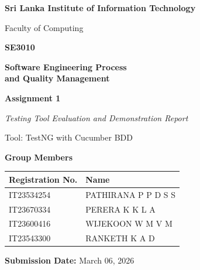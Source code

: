 \documentclass[12pt,a4paper]{article}
\begin{document}
\begin{titlepage}
    \centering
    \vspace*{1.5cm}

    {\Large\textbf{Sri Lanka Institute of Information Technology}\par}
    \vspace{0.3cm}
    {\large Faculty of Computing\par}

    \vspace{2cm}

    {\LARGE\bfseries\color{sliitblue} SE3010\par}
    \vspace{0.3cm}
    {\Large\bfseries Software Engineering Process\\and Quality Management\par}

    \vspace{1.5cm}

    {\Huge\bfseries Assignment 1\par}
    \vspace{0.5cm}
    {\Large\itshape Testing Tool Evaluation and Demonstration Report\par}
    \vspace{0.3cm}
    {\large Tool: TestNG with Cucumber BDD\par}

    \vspace{2cm}

    {\large\bfseries Group Members\par}
    \vspace{0.5cm}

    \begin{tabular}{ll}
        \toprule
        \textbf{Registration No.} & \textbf{Name} \\
        \midrule
        IT23534254 & PATHIRANA P P D S S \\
        IT23670334 & PERERA K K L A \\
        IT23600416 & WIJEKOON W M V M \\
        IT23543300 & RANKETH K A D \\
        \bottomrule
    \end{tabular}

    \vspace{2cm}

    {\large\textbf{Submission Date:} March 06, 2026\par}

    \vfill
\end{titlepage}
\end{document}
